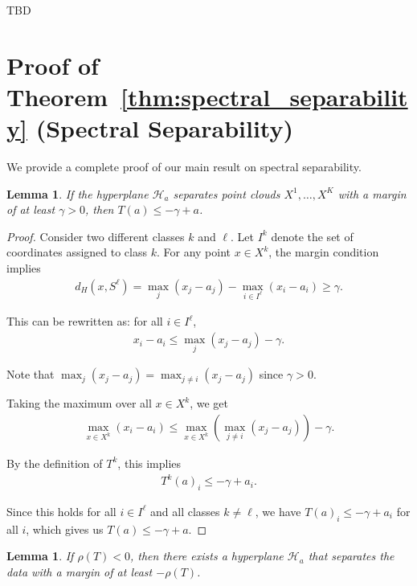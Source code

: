 \documentclass{article}
\newtheorem{lemma}[theorem]{Lemma}
\begin{document}
TBD




\newpage
\appendix
\section{Proof of Theorem~\ref{thm:spectral_separability} (Spectral Separability)}\label{appendix:proofs}
We provide a complete proof of our main result on spectral separability.

\begin{lemma}\label{lemma:hyperplane_to_operator}
If the hyperplane $\mathcal{H}_a$ separates point clouds $X^1,\ldots,X^K$ with a margin of at least $\gamma > 0$, then $T(a) \leq -\gamma + a$.
\end{lemma}

\begin{proof}
Consider two different classes $k$ and $\ell$. Let $I^k$ denote the set of coordinates assigned to class $k$. For any point $x \in X^k$, the margin condition implies
\begin{align}
d_H(x, S^{\ell}) = \max_j(x_j - a_j) - \max_{i \in I^{\ell}}(x_i - a_i) \geq \gamma.
\end{align}

This can be rewritten as: for all $i \in I^{\ell}$,
\begin{align}
x_i - a_i \leq \max_j(x_j - a_j) - \gamma.
\end{align}

Note that $ \max_j(x_j - a_j) = \max_{j\neq i}(x_j - a_j) $ since $\gamma >0$.

Taking the maximum over all $x \in X^k$, we get
\begin{align}
\max_{x \in X^k}(x_i - a_i) \leq \max_{x \in X^k}(\max_{j\neq i}(x_j - a_j)) - \gamma.
\end{align}

By the definition of $T^k$, this implies
\begin{align}
T^k(a)_i \leq -\gamma + a_i.
\end{align}

Since this holds for all $i \in I^{\ell}$ and all classes $k \neq \ell$, we have $T(a)_i \leq -\gamma + a_i$ for all $i$, which gives us $T(a) \leq -\gamma + a$.
\end{proof}

\begin{lemma}\label{lemma:operator_to_hyperplane}
If $\rho(T) < 0$, then there exists a hyperplane $\mathcal{H}_a$ that separates the data with a margin of at least $-\rho(T)$.
\end{lemma}
\end{document}
